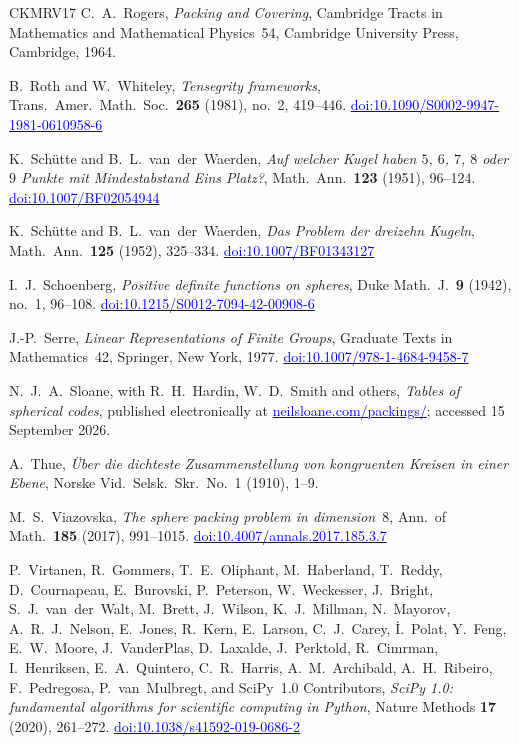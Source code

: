 \documentclass[11pt,reqno]{amsart}
\newcommand{\bluelink}[2]{\href{#1}{\textcolor{blue}{#2}}}
\renewcommand{\_}{\origunderscore\allowbreak}
\numberwithin{equation}{section}
\theoremstyle{plain}
\theoremstyle{definition}
\theoremstyle{remark}
\begin{document}
\begin{thebibliography}{CKMRV17}
C.~A.~Rogers,
\textit{Packing and Covering},
Cambridge Tracts in Mathematics and Mathematical Physics~54,
Cambridge University Press, Cambridge, 1964.

B.~Roth and W.~Whiteley,
\textit{Tensegrity frameworks},
Trans.\ Amer.\ Math.\ Soc.\ \textbf{265} (1981), no.~2, 419--446.
\bluelink{https://doi.org/10.1090/S0002-9947-1981-0610958-6}{doi:10.1090/S0002-9947-1981-0610958-6}

K.~Sch\"utte and B.~L.~van~der~Waerden,
\textit{Auf welcher Kugel haben $5$, $6$, $7$, $8$ oder $9$ Punkte mit
Mindestabstand Eins Platz?},
Math.\ Ann.\ \textbf{123} (1951), 96--124.
\bluelink{https://doi.org/10.1007/BF02054944}{doi:10.1007/BF02054944}

K.~Sch\"utte and B.~L.~van~der~Waerden,
\textit{Das Problem der dreizehn Kugeln},
Math.\ Ann.\ \textbf{125} (1952), 325--334.
\bluelink{https://doi.org/10.1007/BF01343127}{doi:10.1007/BF01343127}

I.~J.~Schoenberg,
\textit{Positive definite functions on spheres},
Duke Math.\ J.\ \textbf{9} (1942), no.~1, 96--108.
\bluelink{https://doi.org/10.1215/S0012-7094-42-00908-6}{doi:10.1215/S0012-7094-42-00908-6}

J.-P.~Serre,
\textit{Linear Representations of Finite Groups},
Graduate Texts in Mathematics~42, Springer, New York, 1977.
\bluelink{https://doi.org/10.1007/978-1-4684-9458-7}{doi:10.1007/978-1-4684-9458-7}

N.~J.~A.~Sloane, with R.~H.~Hardin, W.~D.~Smith and others,
\textit{Tables of spherical codes}, published electronically at
\bluelink{http://neilsloane.com/packings/}{neilsloane.com/packings/};
accessed 15 September 2026.

A.~Thue,
\textit{\"Uber die dichteste Zusammenstellung von kongruenten Kreisen in einer Ebene},
Norske Vid.\ Selsk.\ Skr.\ No.~1 (1910), 1--9.

M.~S.~Viazovska,
\textit{The sphere packing problem in dimension~$8$},
Ann.\ of Math.\ \textbf{185} (2017), 991--1015.
\bluelink{https://doi.org/10.4007/annals.2017.185.3.7}{doi:10.4007/annals.2017.185.3.7}

P.~Virtanen, R.~Gommers, T.~E.~Oliphant, M.~Haberland, T.~Reddy,
D.~Cournapeau, E.~Burovski, P.~Peterson, W.~Weckesser, J.~Bright,
S.~J.~van~der~Walt, M.~Brett, J.~Wilson, K.~J.~Millman, N.~Mayorov,
A.~R.~J.~Nelson, E.~Jones, R.~Kern, E.~Larson, C.~J.~Carey,
\.{I}.~Polat, Y.~Feng, E.~W.~Moore, J.~VanderPlas, D.~Laxalde,
J.~Perktold, R.~Cimrman, I.~Henriksen, E.~A.~Quintero, C.~R.~Harris,
A.~M.~Archibald, A.~H.~Ribeiro, F.~Pedregosa, P.~van~Mulbregt, and
SciPy~1.0 Contributors,
\textit{{S}ci{P}y 1.0: fundamental algorithms for scientific computing in
{P}ython},
Nature Methods \textbf{17} (2020), 261--272.
\bluelink{https://doi.org/10.1038/s41592-019-0686-2}{doi:10.1038/s41592-019-0686-2}


\end{thebibliography}
\end{document}
